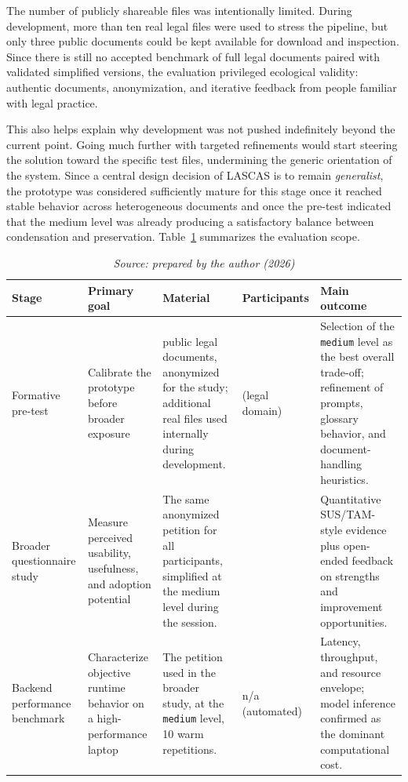 \documentclass[english]{UNISINOSartigo} %
\newcommand{\floatsource}[1]{\caption*{\footnotesize\textit{Source: #1}}}
\newcommand{\tablesource}[1]{\floatsource{#1}}
\begin{document}
The number of publicly shareable files was intentionally limited. During development, more than ten real legal files were used to stress the pipeline, but only three public documents could be kept available for download and inspection. Since there is still no accepted benchmark of full legal documents paired with validated simplified versions, the evaluation privileged ecological validity: authentic documents, anonymization, and iterative feedback from people familiar with legal practice.

This also helps explain why development was not pushed indefinitely beyond the current point. Going much further with targeted refinements would start steering the solution toward the specific test files, undermining the generic orientation of the system. Since a central design decision of LASCAS is to remain \textit{generalist}, the prototype was considered sufficiently mature for this stage once it reached stable behavior across heterogeneous documents and once the pre-test indicated that the medium level was already producing a satisfactory balance between condensation and preservation. Table~\ref{tab:eval-scope} summarizes the evaluation scope.

\begin{table}[H]
\centering
\caption{Evaluation stages and rationale adopted in this study.}
\label{tab:eval-scope}
\footnotesize
\setlength{\tabcolsep}{5pt}
\renewcommand{\arraystretch}{1.18}
\begin{tabularx}{\textwidth}{@{}>{\raggedright\arraybackslash}p{2.4cm} >{\raggedright\arraybackslash}p{2.8cm} >{\raggedright\arraybackslash}X >{\raggedright\arraybackslash}p{1.8cm} >{\raggedright\arraybackslash}X@{}}
\toprule
\textbf{Stage} & \textbf{Primary goal} & \textbf{Material} & \textbf{Participants} & \textbf{Main outcome} \\
\midrule
Formative pre-test & Calibrate the prototype before broader exposure & 3 public legal documents, anonymized for the study; additional real files used internally during development. & 3 (legal domain) & Selection of the \texttt{medium} level as the best overall trade-off; refinement of prompts, glossary behavior, and document-handling heuristics. \\
\addlinespace[1pt]
Broader questionnaire study & Measure perceived usability, usefulness, and adoption potential & The same anonymized petition for all participants, simplified at the medium level during the session. & 30 & Quantitative SUS/TAM-style evidence plus open-ended feedback on strengths and improvement opportunities. \\
\addlinespace[1pt]
Backend performance benchmark & Characterize objective runtime behavior on a high-performance laptop & The petition used in the broader study, at the \texttt{medium} level, 10 warm repetitions. & n/a (automated) & Latency, throughput, and resource envelope; model inference confirmed as the dominant computational cost. \\
\bottomrule
\end{tabularx}
\tablesource{prepared by the author (2026)}
\end{table}
\end{document}
